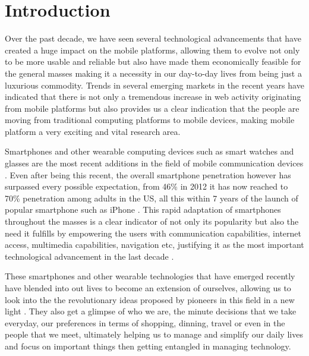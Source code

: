 \documentclass[prodmode,acmtecs]{acmsmall}
\begin{document}
\maketitle


\section{Introduction}
Over the past decade, we have seen several technological advancements that have created a huge impact on the mobile platforms, allowing them to evolve not only to be more usable and reliable but also have made them economically feasible for the general masses making it a necessity in our day-to-day lives from being just a luxurious commodity. Trends in several emerging markets in the recent years have indicated that there is not only a tremendous increase in web activity originating from mobile platforms but also provides us a clear indication that the people are moving from traditional computing platforms to mobile devices, making mobile platform a very exciting and vital research area.

Smartphones and other wearable computing devices such as smart watches and glasses are the most recent additions in the field of mobile communication devices \cite{oulasvirta2012habits}. Even after being this recent, the overall smartphone penetration however has surpassed every possible expectation, from 46\% in 2012 it has now reached to 70\% penetration among adults in the US, all this within 7 years of the launch of popular smartphone such as iPhone \cite{smith201246,Asymco2012}. This rapid adaptation of smartphones throughout the masses is a clear indicator of not only its popularity but also the need it fulfills by empowering the users with communication capabilities, internet access, multimedia capabilities, navigation etc, justifying it as the most important technological advancement in the last decade \cite{ross2011top}.

These smartphones and other wearable technologies that have emerged recently have blended into out lives to become an extension of ourselves, allowing us to look into the the revolutionary ideas proposed by pioneers in this field in a new light \cite{weiser1991computer}. They also get a glimpse of who we are, the minute decisions that we take everyday, our preferences in terms of shopping, dinning, travel or even in the people that we meet, ultimately helping us to manage and simplify our daily lives and focus on important things then getting entangled in managing technology. 
\end{document}
